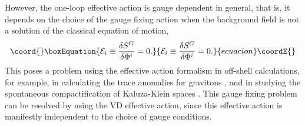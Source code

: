 \documentclass[a4paper,aps,preprint,groupedaddress,showpacs]{revtex4}
\begin{document}
However, the one-loop effective action \coordHE{} is gauge dependent 
in general, that is, it depends on the choice of the gauge fixing
action \coordHE{} when the background field is not a solution of
the classical equation of motion,
\begin{equation}\coord{}\boxEquation{
{\cal E}_{i}\equiv\frac{\delta S^{G}}{\delta\Phi^{i}}=0.
}{
{\cal E}_{i}\equiv\frac{\delta S^{G}}{\delta\Phi^{i}}=0.
}{ecuacion}\coordE{}\end{equation}
This poses a problem using the effective action
formalism in off-shell calculations, for example,
in calculating the trace anomalies for gravitons \cite{CK3}, and in studying
the spontaneous compactification of Kaluza-Klein spaces
\cite{HKLT}. 
This gauge fixing problem can be resolved by using 
the VD effective action, since this effective
action is manifestly independent to the choice 
of gauge conditions. 
\end{document}
